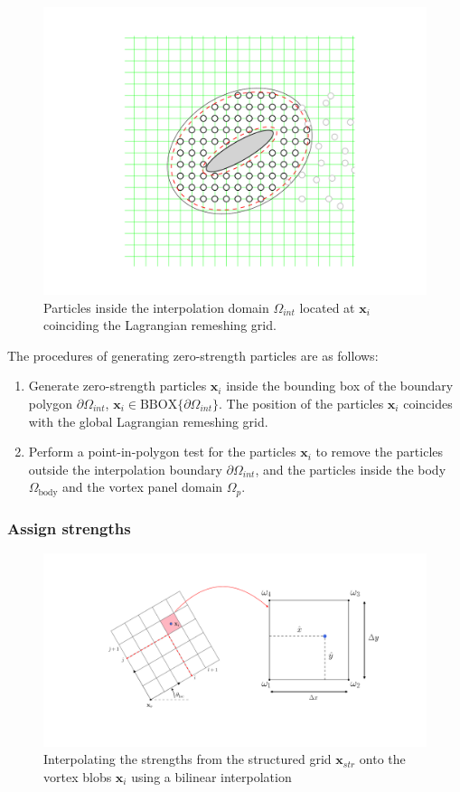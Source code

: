 	\begin{figure}[h]
	\centering
	\includegraphics[trim=4.37cm 2.3cm 4.cm 2.cm, clip, width=0.5\linewidth]{./figures/hybrid/interpolation/ellipse/generatedParticles.pdf}
	\caption{Particles inside the interpolation domain $\Omega_{int}$ located at $\mathbf{x}_i$ coinciding the Lagrangian remeshing grid.}
	\label{fig:generatedParticles}
	\end{figure}

The procedures of generating zero-strength particles are as follows:
\begin{enumerate}
\item Generate zero-strength particles $\mathbf{x}_i$ inside the bounding box of the boundary polygon $\partial \Omega_{int}$, $\mathbf{x}_i \in \mathrm{BBOX}\{\partial \Omega_{int}\}$. The position of the particles $\mathbf{x}_i$ coincides with the global Lagrangian remeshing grid.
\item Perform a point-in-polygon test for the particles $\mathbf{x}_i$ to remove the particles outside the interpolation boundary $\partial \Omega_{int}$, and the particles inside the body $\Omega_{\mathrm{body}}$ and the vortex panel domain $\Omega_p$.
\end{enumerate}


\subsubsection*{Assign strengths}

	\begin{figure}[h]
	\centering
	\includegraphics[trim=5.5cm 3.cm 4.5cm 3cm, clip, width=0.99\linewidth]{./figures/hybrid/interpolation/ellipse/interpolationManual.pdf}
	\caption{Interpolating the strengths from the structured grid $\mathbf{x}_{str}$ onto the vortex blobs $\mathbf{x}_i$ using a bilinear interpolation}
	\label{fig:interpolationManual}
	\end{figure}


